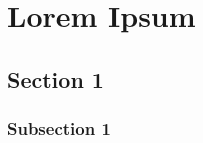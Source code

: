 \chapter{Lorem Ipsum}
\lipsum[1]
\section{Section 1}
\lipsum[2-3]
\subsection{Subsection 1}
\lipsum[4-5]